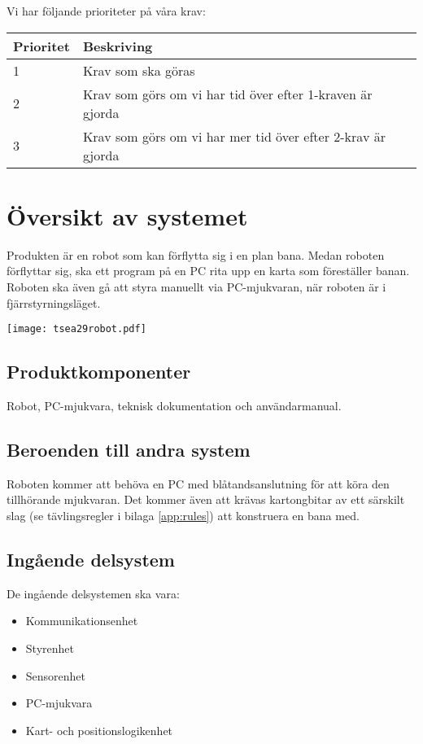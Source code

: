 \documentclass[a4paper,12pt]{article}
\begin{document}
Vi har följande prioriteter på våra krav:

\begin{tabular}{ l l }
  Prioritet & Beskriving \\
  \hline
  1 & Krav som ska göras \\
  2 & Krav som görs om vi har tid över efter 1-kraven är gjorda \\
  3 & Krav som görs om vi har mer tid över efter 2-krav är gjorda \\
\end{tabular}

\pagebreak %

\section{Översikt av systemet}

Produkten är en robot som kan förflytta sig i en plan bana.
Medan roboten förflyttar sig, ska ett program på en PC rita upp en karta
som föreställer banan. Roboten ska även gå att styra manuellt via
PC-mjukvaran, när roboten är i fjärrstyrningsläget.

\texttt{[image: tsea29robot.pdf]}

\subsection{Produktkomponenter}
Robot, PC-mjukvara, teknisk dokumentation och användarmanual.

\subsection{Beroenden till andra system}
Roboten kommer att behöva en PC med blåtandsanslutning för att köra den
tillhörande mjukvaran. Det kommer även att krävas kartongbitar av ett
särskilt slag (se tävlingsregler i bilaga \ref{app:rules}) att konstruera
en bana med.

\subsection{Ingående delsystem}

De ingående delsystemen ska vara:

\begin{itemize}
\item Kommunikationsenhet
\item Styrenhet
\item Sensorenhet
\item PC-mjukvara
\item Kart- och positionslogikenhet
\end{itemize}
\end{document}

